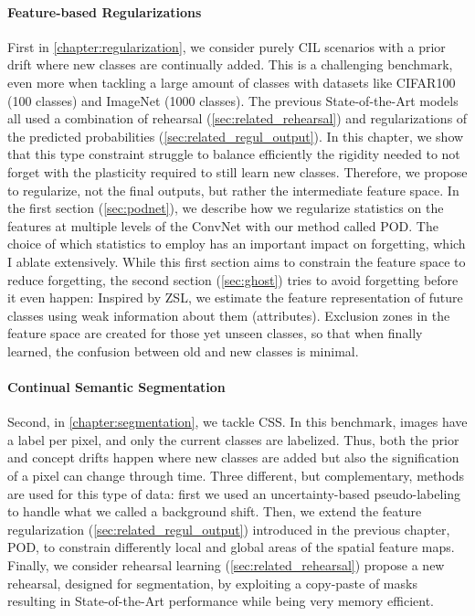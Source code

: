 \paragraph{Feature-based Regularizations} First in \autoref{chapter:regularization}, we consider
purely \acf{CIL} scenarios with a prior drift where new classes are continually added. This is a
challenging benchmark, even more when tackling a large amount of classes with datasets like CIFAR100
(100 classes) and ImageNet (1000 classes). The previous State-of-the-Art models all used a
combination of rehearsal (\autoref{sec:related_rehearsal}) and regularizations of the predicted
probabilities (\autoref{sec:related_regul_output}). In this chapter, we show that this type
constraint struggle to balance efficiently the rigidity needed to not forget with the plasticity
required to still learn new classes. Therefore, we propose to regularize, not the final outputs, but
rather the intermediate feature space. In the first section (\autoref{sec:podnet}), we describe how
we regularize statistics on the features at multiple levels of the \ac{ConvNet} with our method
called POD. The choice of which statistics to employ has an important impact on forgetting, which I
ablate extensively. While this first section aims to constrain the feature space to reduce
forgetting, the second section (\autoref{sec:ghost}) tries to avoid forgetting before it even
happen: Inspired by \ac{ZSL}, we estimate the feature representation of future classes using weak
information about them (\eg attributes). Exclusion zones in the feature space are created for those
yet unseen classes, so that when finally learned, the confusion between old and new classes is
minimal.

\paragraph{Continual Semantic Segmentation} Second, in \autoref{chapter:segmentation}, we tackle
\acf{CSS}. In this benchmark, images have a label per pixel, and only the current classes are
labelized. Thus, both the prior and concept drifts happen where new classes are added but also the
signification of a pixel can change through time. Three different, but complementary, methods are
used for this type of data: first we used an uncertainty-based pseudo-labeling to handle what we
called a background shift. Then, we extend the feature regularization
(\autoref{sec:related_regul_output}) introduced in the previous chapter, POD, to constrain
differently local and global areas of the spatial feature maps. Finally, we consider rehearsal
learning (\autoref{sec:related_rehearsal}) propose a new rehearsal, designed for segmentation, by
exploiting a copy-paste of masks resulting in State-of-the-Art performance while being very memory
efficient.


